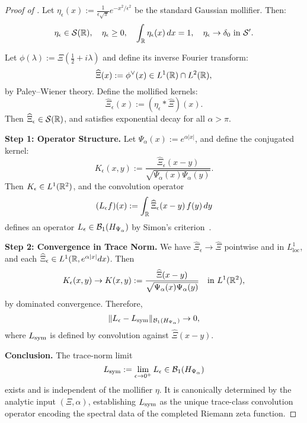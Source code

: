 \begin{proof}[Proof of ]
Let \( \eta_\epsilon(x) := \frac{1}{\epsilon \sqrt{\pi}} e^{-x^2 / \epsilon^2} \) be the standard Gaussian mollifier. Then:
\[
\eta_\epsilon \in \mathcal{S}(\mathbb{R}), \quad \eta_\epsilon \ge 0, \quad \int_{\mathbb{R}} \eta_\epsilon(x)\, dx = 1, \quad \eta_\epsilon \to \delta_0 \text{ in } \mathcal{S}'.
\]

Let \( \phi(\lambda) := \Xi\left(\tfrac{1}{2} + i\lambda\right) \) and define its inverse Fourier transform:
\[
\widehat{\Xi}(x) := \phi^\vee(x) \in L^1(\mathbb{R}) \cap L^2(\mathbb{R}),
\]
by Paley--Wiener theory. Define the mollified kernels:
\[
\widehat{\Xi}_\epsilon(x) := (\eta_\epsilon * \widehat{\Xi})(x).
\]
Then \( \widehat{\Xi}_\epsilon \in \mathcal{S}(\mathbb{R}) \), and satisfies exponential decay for all \( \alpha > \pi \).

\smallskip
\noindent\textbf{Step 1: Operator Structure.}  
Let \( \Psi_\alpha(x) := e^{\alpha |x|} \), and define the conjugated kernel:
\[
K_\epsilon(x, y) := \frac{\widehat{\Xi}_\epsilon(x - y)}{\sqrt{\Psi_\alpha(x) \Psi_\alpha(y)}}.
\]
Then \( K_\epsilon \in L^1(\mathbb{R}^2) \), and the convolution operator
\[
(L_\epsilon f)(x) := \int_{\mathbb{R}} \widehat{\Xi}_\epsilon(x - y)\, f(y)\, dy
\]
defines an operator \( L_\epsilon \in \mathcal{B}_1(H_{\Psi_\alpha}) \) by Simon’s criterion~\cite[Thm.~3.1]{Simon2005TraceIdeals}.

\smallskip
\noindent\textbf{Step 2: Convergence in Trace Norm.}  
We have \( \widehat{\Xi}_\epsilon \to \widehat{\Xi} \) pointwise and in \( L^1_{\mathrm{loc}} \), and each \( \widehat{\Xi}_\epsilon \in L^1(\mathbb{R}, e^{\alpha |x|} dx) \). Then
\[
K_\epsilon(x, y) \to K(x, y) := \frac{\widehat{\Xi}(x - y)}{\sqrt{\Psi_\alpha(x) \Psi_\alpha(y)}} \quad \text{in } L^1(\mathbb{R}^2),
\]
by dominated convergence. Therefore,
\[
\| L_\epsilon - L_{\mathrm{sym}} \|_{\mathcal{B}_1(H_{\Psi_\alpha})} \to 0,
\]
where \( L_{\mathrm{sym}} \) is defined by convolution against \( \widehat{\Xi}(x - y) \).

\smallskip
\noindent\textbf{Conclusion.}  
The trace-norm limit
\[
L_{\mathrm{sym}} := \lim_{\epsilon \to 0^+} L_\epsilon \in \mathcal{B}_1(H_{\Psi_\alpha})
\]
exists and is independent of the mollifier \( \eta \). It is canonically determined by the analytic input \( (\Xi, \alpha) \), establishing \( L_{\mathrm{sym}} \) as the unique trace-class convolution operator encoding the spectral data of the completed Riemann zeta function.
\end{proof}
